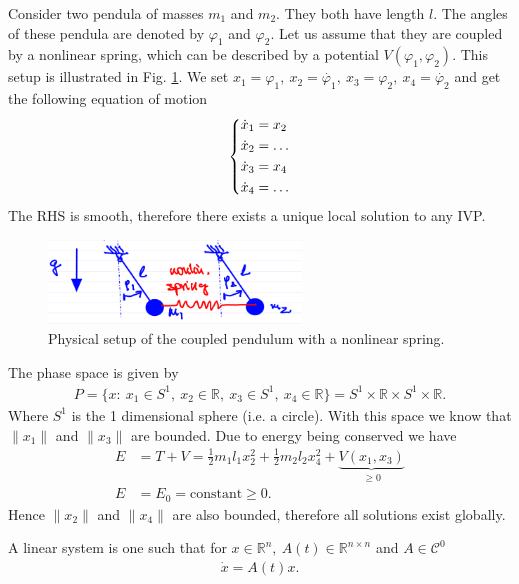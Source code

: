 \begin{ex}
	Consider two pendula of masses $m_1$ and $m_2$. They both have length $l$. The angles of these pendula are denoted by $\varphi_1$ and $\varphi_2$. Let us assume that they are coupled by a nonlinear spring, which can be described by a potential $V(\varphi_1, \varphi_2)$. This setup is illustrated in Fig. \ref{fig:coupled_pendulum}. We set $x_1 = \varphi_1,\ x_2 = \dot{\varphi_1},\ x_3 = \varphi_2,\ x_4=\dot{\varphi_2} $ and get the following equation of motion
\begin{align}
	\begin{dcases}
		\dot{x}_1 = x_2 \\ \dot{x}_2 = \ldots \\ \dot{x}_3 = x_4 \\ \dot{x}_4 = \ldots
	\end{dcases}
\end{align}
The RHS is smooth, therefore there exists a unique local solution to any IVP.
\begin{figure}[h!]
	\centering
	\includegraphics[width=0.6\textwidth]{figures/ch1/6coupled_pendulum.png}
	\caption{Physical setup of the coupled pendulum with a nonlinear spring.}
	\label{fig:coupled_pendulum}
\end{figure}
The phase space is given by 
\begin{align}
	P = \{ {x}:\ x_1 \in S^1,\ x_2 \in \mathbb{R},\ x_3 \in S^1,\ x_4 \in \mathbb{R} \} = S^1 \times \mathbb{R}\times S^1 \times \mathbb{R}.
\end{align}
Where $S^1$ is the 1 dimensional sphere (i.e. a circle). With this space we know that $ \|x_1 \|$ and $ \|x_3 \|$ are bounded. Due to energy being conserved we have
\begin{subequations}\begin{align}
	E &= T+V = \frac{1}{2}m_1 l_1 x_2^2 + \frac{1}{2}m_2 l_2 x_4^2 + \underbrace{V(x_1, x_3)}_{\geq 0}\\
	E &= E_0 =  \textrm{constant} \geq 0.
\end{align}\end{subequations}
Hence $ \|x_2 \|$ and $ \|x_4 \|$ are also bounded, therefore all solutions exist globally.
\end{ex}
\begin{definition}
	A linear system is one such that for $ {x}\in \mathbb{R}^{n},\ {A}(t) \in \mathbb{R}^{n\times n}$ and ${A}\in \mathcal{C}^0$ 
	\begin{align}
		\boxed{\dot{ {x}} = {A}(t)  {x}.}
	\end{align}
\end{definition}

